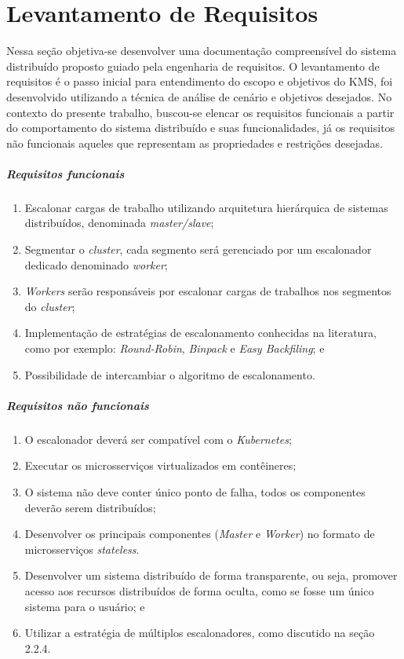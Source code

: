 \section{Levantamento de Requisitos}

Nessa seção objetiva-se desenvolver uma documentação compreensível do sistema distribuído proposto guiado pela engenharia de requisitos. O levantamento de requisitos é o passo inicial para entendimento do escopo e objetivos do \ac{KMS}, foi desenvolvido utilizando a técnica de análise de cenário e objetivos desejados. No contexto do presente trabalho, buscou-se elencar os requisitos funcionais a partir do comportamento do sistema distribuído e suas funcionalidades, já os requisitos não funcionais aqueles que representam as propriedades e restrições desejadas. 

\subparagraph{Requisitos funcionais}
\begin{enumerate}
	\item Escalonar cargas de trabalho utilizando arquitetura hierárquica de sistemas distribuídos, denominada \textit{master/slave};
	\item Segmentar o \textit{cluster}, cada segmento será gerenciado por um escalonador dedicado denominado \textit{worker};
	\item \textit{Workers} serão responsáveis por escalonar cargas de trabalhos nos segmentos do \textit{cluster};
	\item Implementação de estratégias de escalonamento conhecidas na literatura, como por exemplo: \textit{Round-Robin}, \textit{Binpack} e \textit{Easy Backfiling}; e
	\item Possibilidade de intercambiar o algoritmo de escalonamento.
\end{enumerate}

\subparagraph{Requisitos não funcionais}
\begin{enumerate}
	\item O escalonador deverá ser compatível com o \textit{Kubernetes};
	\item Executar os microsserviços virtualizados em contêineres;
	\item O sistema não deve conter único ponto de falha, todos os componentes deverão serem distribuídos;
	\item Desenvolver os principais componentes (\textit{Master} e \textit{Worker}) no formato de microsserviços \textit{stateless}.
	\item Desenvolver um sistema distribuído de forma transparente, ou seja, promover acesso aos recursos distribuídos de forma oculta, como se fosse um único sistema para o usuário; e
	\item Utilizar a estratégia de múltiplos escalonadores, como discutido na seção 2.2.4.
\end{enumerate}

